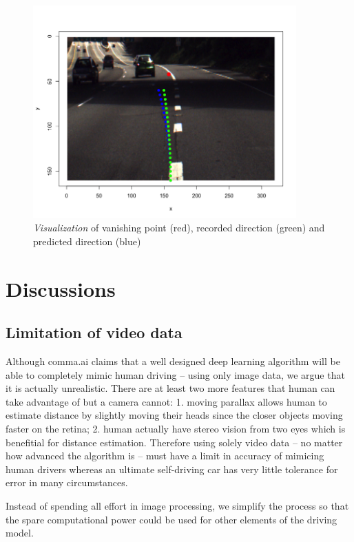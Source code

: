 \documentclass[11pt, oneside]{article}
\begin{document}
\begin{figure}[!ht]
  \centering
      \includegraphics[width=0.9\textwidth]{Rplot3.png} 
  \caption{\textit{Visualization} of vanishing point (red), recorded direction (green) and predicted direction (blue)}
\end{figure}


\section*{Discussions}

\subsection*{Limitation of video data}

Although comma.ai claims that a well designed deep learning algorithm will be able to completely mimic human driving -- using only image data, we argue that it is actually unrealistic. There are at least two more features that human can take advantage of but a camera cannot: 1. moving parallax allows human to estimate distance by slightly moving their heads since the closer objects moving faster on the retina; 2. human actually have stereo vision from two eyes which is benefitial for distance estimation. Therefore using solely video data -- no matter how advanced the algorithm is -- must have a limit in accuracy of mimicing human drivers whereas an ultimate self-driving car has very little tolerance for error in many circumstances. 

Instead of spending all effort in image processing, we simplify the process so that the spare computational power could be used for other elements of the driving model. 
\end{document}
